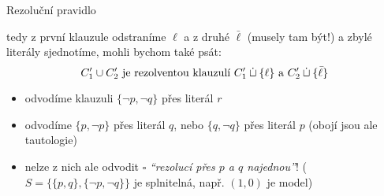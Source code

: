 \documentclass{beamer}
\begin{document}
\begin{frame}{Rezoluční pravidlo}    
    
    
    tedy z první klauzule odstraníme $\ell$ a z druhé $\bar\ell$ (musely tam být!) a zbylé literály sjednotíme, mohli bychom také psát: 
    $$
    C_1'\mathbin{\cup} C_2'\text{ je rezolventou klauzulí }C_1'\mathbin{\dot{\sqcup}}\{\ell\}\text{ a }C_2'\mathbin{\dot{\sqcup}}\{\bar \ell\}
    $$
    \vspace{-12pt}
    \begin{itemize}
        \item {}
        odvodíme klauzuli $\{\neg p,\neg q\}$ přes literál $r$
        \item {}
        odvodíme $\{p,\neg p\}$ přes literál $q$, nebo $\{q,\neg q\}$ přes literál $p$ (obojí jsou ale tautologie)
        \item nelze z nich ale odvodit $\square$ \emph{``rezolucí přes $p$ a $q$ najednou''}! ($S=\{\{p,q\},\{\neg p,\neg q\}\}$ je splnitelná, např. $(1,0)$ je model)
    \end{itemize}

\end{frame}
\end{document}
